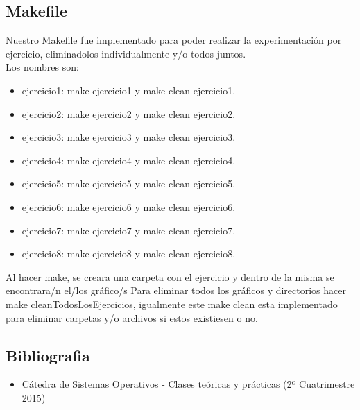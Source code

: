 
\subsection{Makefile}

Nuestro Makefile fue implementado para poder realizar la experimentaci\'on por ejercicio, eliminadolos individualmente y/o todos juntos.\\
Los nombres son:\\
\begin{itemize}
 \item ejercicio1: make ejercicio1 y make clean ejercicio1.
 \item ejercicio2: make ejercicio2 y make clean ejercicio2.
 \item ejercicio3: make ejercicio3 y make clean ejercicio3.
 \item ejercicio4: make ejercicio4 y make clean ejercicio4.
 \item ejercicio5: make ejercicio5 y make clean ejercicio5.
 \item ejercicio6: make ejercicio6 y make clean ejercicio6.
 \item ejercicio7: make ejercicio7 y make clean ejercicio7.
 \item ejercicio8: make ejercicio8 y make clean ejercicio8.
\end{itemize}

Al hacer make, se creara una carpeta con el ejercicio y dentro de la misma se encontrara/n el/los gr\'afico/s
Para eliminar todos los gr\'aficos y directorios hacer make cleanTodosLosEjercicios, igualmente este make clean esta implementado
para eliminar carpetas y/o archivos si estos existiesen o no.\\

\subsection{Bibliografia}

\begin{itemize}
 \item C\'atedra de Sistemas Operativos - Clases te\'oricas y pr\'acticas (2º Cuatrimestre 2015)
 \end{itemize}